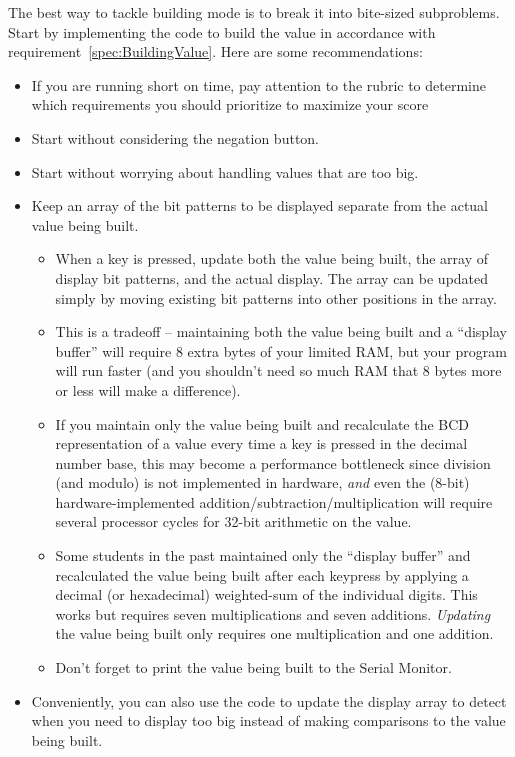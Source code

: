 The best way to tackle building mode is to break it into bite-sized
subproblems. Start by implementing the code to build the value in accordance
with requirement~\ref{spec:BuildingValue}. Here are some recommendations:
    \begin{itemize}
    \item If you are running short on time, pay attention to the rubric to
        determine which requirements you should prioritize to maximize your
        score
    \item Start without considering the negation button.
    \item Start without worrying about handling values that are too big.
    \item Keep an array of the bit patterns to be displayed separate from the
        actual value being built.
        \begin{itemize}
        \item When a key is pressed, update both the value being built, the
        array of display bit patterns, and the actual display. The array can be
        updated simply by moving existing bit patterns into other positions in
        the array.
        \item This is a tradeoff -- maintaining both the value being built
        and a ``display buffer'' will require 8 extra bytes of your limited
        RAM, but your program will run faster (and you shouldn't need so much
        RAM that 8 bytes more or less will make a difference).
        \item If you maintain only the value being built and recalculate the BCD
        representation of a value every time a key is pressed in the decimal
        number base, this may become a performance bottleneck since division
        (and modulo) is not implemented in hardware, \textit{and} even the
        (8-bit) hardware-implemented addition/subtraction/multiplication will
        require several processor cycles for 32-bit arithmetic on the value.
        \item Some students in the past maintained only the ``display buffer''
        and recalculated the value being built after each keypress by applying
        a decimal (or hexadecimal) weighted-sum of the individual digits. This
        works but requires seven multiplications and seven additions.
        \textit{Updating} the value being built only requires one
        multiplication and one addition.
        \item Don't forget to print the value being built to the Serial Monitor.
        \end{itemize}
    \item Conveniently, you can also use the code to update the display array
        to detect when you need to display {\dviiseg too big} instead of making
        comparisons to the value being built.
    \end{itemize}

